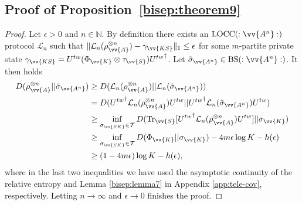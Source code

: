 \documentclass[aps,pra,twocolumn,superscriptaddress,longbibliography]{revtex4-1}
\def\Tr{\operatorname{Tr}}
\def\BS{\operatorname{BS}}
\def\LOCC{\operatorname{LOCC}}
\newcommand{\mc}[1]{\mathcal{#1}}
\begin{document}
\begin{appendix}
\section{Proof of Proposition~\ref{bisep:theorem9}}
\begin{proof}
Let $\epsilon>0$ and $n\in\mathbb{N}$. By definition there exists an $\LOCC(:\vv{A^n}:)$ protocol $\mc{L}_n$ such that $\|\mc{L}_n(\rho_{\vv{A}}^{\otimes n})-\gamma_{\vv{KS}}\|_1\leq\epsilon$ for some $m$-partite private state $\gamma_{\vv{KS}}=U^{tw}(\Phi_{\vv{K}}\otimes\tau_{\vv{S}}){U^{tw}}^\dagger$. Let $\tilde{\sigma}_{\vv{A^n}}\in\BS(:\vv{A^n}:)$. It then holds
\begin{align}
D(\rho_{\vv{A}}^{\otimes n}||\tilde{\sigma}_{\vv{A^n}})&\geq D(\mc{L}_n(\rho_{\vv{A}}^{\otimes n})||\mc{L}_n(\tilde{\sigma}_{\vv{A^n}}))\\
&=D({U^{tw}}^\dagger\mc{L}_n(\rho_{\vv{A}}^{\otimes n}){U^{tw}}||{U^{tw}}^\dagger\mc{L}_n(\tilde{\sigma}_{\vv{A^n}}){U^{tw}})\\
&\geq\inf_{\sigma_{\vv{SK}}\in\mc{T}}D(\Tr_{\vv{S}}[{U^{tw}}^\dagger\mc{L}_n(\rho_{\vv{A}}^{\otimes n}){U^{tw}}]||\sigma_{\vv{K}})\\
&\geq\inf_{\sigma_{\vv{SK}}\in\mc{T}}D(\Phi_{\vv{K}}||\sigma_{\vv{K}})-4m\epsilon\log{K}-h(\epsilon)\\
&\geq(1-4m\epsilon)\log{K}-h(\epsilon),
\end{align}
where in the last two inequalities we have used the asymptotic continuity of the relative entropy and Lemma \ref{bisep:lemma7} in Appendix \ref{app:tele-cov}, respectively. Letting $n\to\infty$ and $\epsilon\to0$ finishes the proof.
\end{proof}
\fi


\end{appendix}
\end{document}
